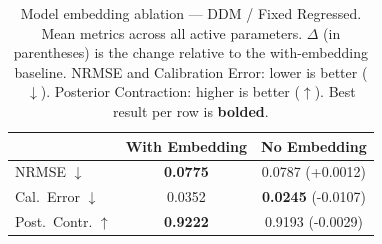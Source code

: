 \begin{table}[t]
\centering
\caption{Model embedding ablation — DDM / Fixed Regressed. Mean metrics across
all active parameters. $\Delta$ (in parentheses) is the change relative to the
with-embedding baseline. NRMSE and Calibration Error: lower is better ($\downarrow$).
Posterior Contraction: higher is better ($\uparrow$). Best result per row is
\textbf{bolded}.}
\label{tab:embed_ablation_ddm_fixed_regressed}
\begin{tabular}{lcc}
\toprule
 & With Embedding & No Embedding \\
\midrule
NRMSE $\downarrow$ & \textbf{0.0775} & 0.0787 \small{(+0.0012)} \\
Cal.\ Error $\downarrow$ & 0.0352 & \textbf{0.0245} \small{(-0.0107)} \\
Post.\ Contr. $\uparrow$ & \textbf{0.9222} & 0.9193 \small{(-0.0029)} \\
\bottomrule
\end{tabular}
\end{table}